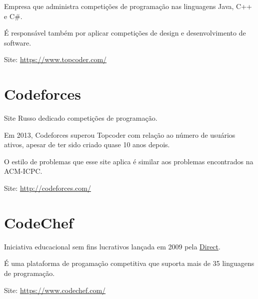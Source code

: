 Empresa que administra competições de programação nas linguagens Java, C++ e C$\#$.

É responsável também por aplicar competições de design e desenvolvimento de software.

Site: \href{https://www.topcoder.com/}{https://www.topcoder.com/}

\section{Codeforces}

Site Russo dedicado competições de programação. 

Em 2013, Codeforces superou Topcoder com relação ao número de usuários ativos, apesar de ter sido criado quase 10 anos depois.

O estilo de problemas que esse site aplica é similar aos problemas encontrados na ACM-ICPC.

Site: \href{http://codeforces.com/}{http://codeforces.com/}

\section{CodeChef}

Iniciativa educacional sem fins lucrativos lançada em 2009 pela \href{http://www.directi.com/}{Direct}.

É uma plataforma de progamação competitiva que suporta mais de 35 linguagens de programação.

Site: \href{https://www.codechef.com/}{https://www.codechef.com/}


